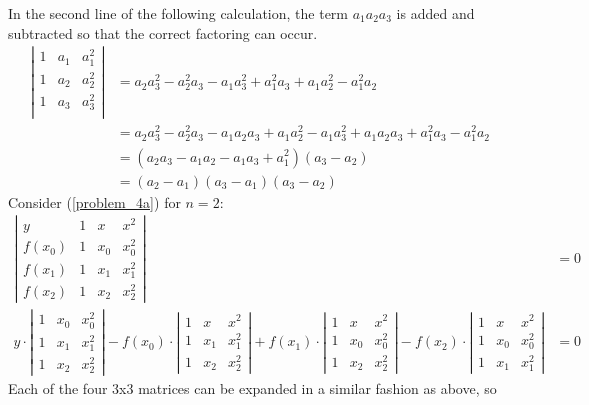 \documentclass[12pt]{article}
\begin{document}
\noindent In the second line of the following calculation, the term $a_1a_2a_3$ is added and subtracted so that the correct factoring can occur.
\begin{align*}
\left|\begin{array}{ccc}
1 & a_1 & a_1^2 \\
1 & a_2 & a_2^2 \\
1 & a_3 & a_3^2 \\
\end{array}\right| &= a_2a_3^2 - a_2^2a_3 - a_1a_3^2 + a_1^2a_3 + a_1a_2^2 - a_1^2a_2 \\
&= a_2a_3^2 - a_2^2a_3 - a_1a_2a_3 + a_1a_2^2 - a_1a_3^2 + a_1a_2a_3 + a_1^2a_3 - a_1^2a_2 \\
&= (a_2a_3 - a_1a_2 - a_1a_3 + a_1^2)(a_3 - a_2) \\
&= (a_2 - a_1)(a_3 - a_1)(a_3 - a_2)
\end{align*}
Consider (\ref{problem_4a}) for $n = 2$:
\begin{align*}
\left|\begin{array}{cccc}
y & 1 & x & x^2 \\
f(x_0) & 1 & x_0 & x_0^2 \\
f(x_1) & 1 & x_1 & x_1^2 \\
f(x_2) & 1 & x_2 & x_2^2
\end{array}\right| &= 0 \\
y\cdot\left|\begin{array}{ccc}
1 & x_0 & x_0^2 \\
1 & x_1 & x_1^2 \\
1 & x_2 & x_2^2
\end{array}\right|
- f(x_0)\cdot\left|\begin{array}{ccc}
1 & x & x^2 \\
1 & x_1 & x_1^2 \\
1 & x_2 & x_2^2
\end{array}\right|
+f(x_1)\cdot\left|\begin{array}{ccc}
1 & x & x^2 \\
1 & x_0 & x_0^2 \\
1 & x_2 & x_2^2
\end{array}\right|
- f(x_2)\cdot\left|\begin{array}{ccc}
1 & x & x^2 \\
1 & x_0 & x_0^2 \\
1 & x_1 & x_1^2
\end{array}\right| &= 0
\end{align*}
Each of the four $3$x$3$ matrices can be expanded in a similar fashion as above, so
\end{document}
